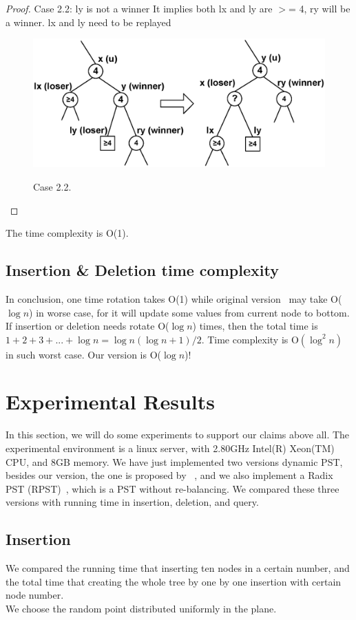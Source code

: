 \documentclass{acm_proc_article-sp}
\begin{document}
\begin{proof}
Case 2.2: ly is not a winner It implies both lx and ly are $>$= 4,
ry will be a winner. lx and ly need to be replayed
\begin{figure}[!h]
  \centering
  \includegraphics[scale=0.4]{case_2_2}\\
  \caption{Case 2.2.}\label{fig:case_2_2}
\end{figure}
\end{proof}

The time complexity is O(1).
\subsection{Insertion \& Deletion time complexity}
In conclusion, one time rotation takes O(1) while original
version~\cite{Edward_04} may take O($\log n$) in worse case, for it
will update some values from current node to bottom. If insertion or
deletion needs rotate O($\log n$) times, then the total time is
$1+2+3+...+\log n = \log n(\log n+1)/2$. Time complexity is
O$(\log^2 n)$ in such worst case. Our version is O($\log n$)!

\section{Experimental Results}
In this section, we will do some experiments to support our claims
above all. The experimental environment is a linux server, with 2.80GHz Intel(R)
Xeon(TM) CPU, and 8GB memory. We have just implemented two versions dynamic PST,
besides our version, the one is proposed by ~\cite{Edward_04}, and we
also implement a Radix PST (RPST)~\cite{Edward_04}, which is a PST without
re-balancing. We compared these three versions with running time 
in insertion, deletion, and query.

\subsection{Insertion}
We compared the running time that inserting ten nodes
in a certain number, and the total time that creating the whole tree
by one by one insertion with certain node number.\\
We choose the random point distributed uniformly in the plane.\\
\end{document}
